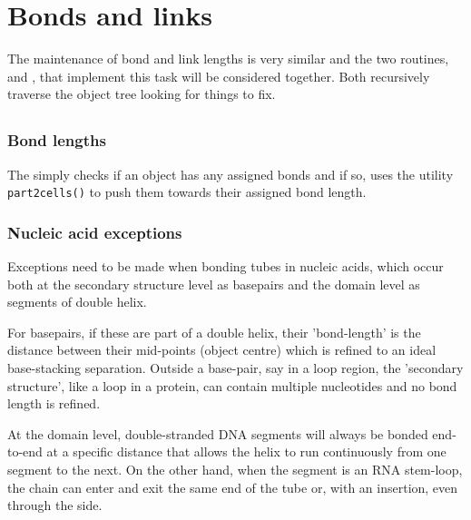 \section{Bonds and links}

The maintenance of bond and link lengths is very similar and the two routines,
 and , that implement this task will be considered together.
Both recursively traverse the object tree looking for things to fix.

\subsection{}

\subsubsection{Bond lengths}

The  simply checks if an object has any assigned bonds and if so, uses
the utility {\tt part2cells()} to push them towards their assigned bond length.

\subsubsection{Nucleic acid exceptions}

Exceptions need to be made when bonding tubes in nucleic acids, which occur both at
the secondary structure level as basepairs and the domain level
as segments of double helix. 

For basepairs, if these are part of a double helix, their 'bond-length' is the distance
between their mid-points (object centre) which is refined to an ideal base-stacking separation.  
Outside a base-pair, say in a loop region, the 'secondary structure', like a loop in a protein,
can contain multiple nucleotides and no bond length is refined.

At the domain level, double-stranded DNA segments will always be bonded end-to-end
at a specific distance that allows the helix to run continuously from one segment to
the next.   On the other hand, when the segment is an RNA stem-loop, the chain can enter
and exit the same end of the tube or, with an insertion, even through the side.


\subsection{}

